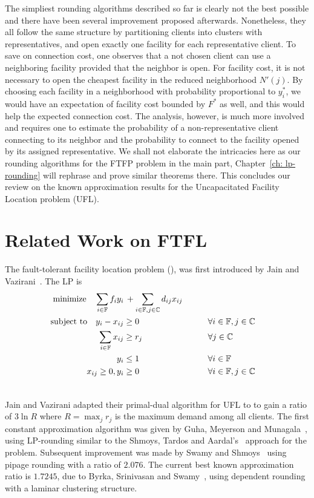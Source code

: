 \documentclass[oneside,final]{ucr}
\begin{document}
The simpliest rounding algorithms described so far is
clearly not the best possible and there have been several
improvement proposed afterwards. Nonetheless, they all
follow the same structure by partitioning clients into
clusters with representatives, and open exactly one facility
for each representative client. To save on connection cost,
one observes that a not chosen client can use a neighboring
facility provided that the neighbor is open. For facility
cost, it is not necessary to open the cheapest facility in
the reduced neighborhood $N'(j)$. By choosing each facility
in a neighborhood with probability proportional to
$y_i^\ast$, we would have an expectation of facility cost
bounded by $F^\ast$ as well, and this would help the
expected connection cost. The analysis, however, is much
more involved and requires one to estimate the probability
of a non-representative client connecting to its neighbor
and the probability to connect to the facility opened by its
assigned representative. We shall not elaborate the
intricacies here as our rounding algorithms for the FTFP
problem in the main part, Chapter~\ref{ch: lp-rounding} will
rephrase and prove similar theorems there. This concludes
our review on the known approximation results for the
Uncapacitated Facility Location problem (UFL).


\section{Related Work on FTFL}
The fault-tolerant facility location problem (\FTFL), was
first introduced by Jain and Vazirani~\cite{JainV03}.  The
LP is
\begin{alignat}{3}
  \textrm{minimize} \quad \sum_{i\in \mathbb{F}}f_iy_i &\,+
  \sum_{i\in \mathbb{F}, j\in \mathbb{C}} d_{ij}x_{ij}
  &\label{eqn:ftfl_primal}
\\ \notag
\textrm{subject to} \quad y_i - x_{ij} &\geq 0 &\quad\quad & \forall i\in \mathbb{F}, j\in \mathbb{C} 
\\ \notag
\sum_{i\in \mathbb{F}} x_{ij} &\geq r_j & &\forall j\in \mathbb{C}
\\ \notag
y_i &\leq 1 & &\forall i \in \mathbb{F}
\\ \notag
x_{ij} \geq 0, y_i &\geq 0 & &\forall i\in \mathbb{F}, j\in
\mathbb{C} 
\\ \notag
\end{alignat}

Jain and Vazirani adapted their primal-dual algorithm for
UFL to {\FTFL} to gain a ratio of $3\ln R$ where $R=\max_j
r_j$ is the maximum demand among all clients. The first
constant approximation algorithm was given by Guha, Meyerson
and Munagala~\cite{GuhaMM03}, using LP-rounding similar to
the Shmoys, Tardos and Aardal's~\cite{ShmoysTA97} approach
for the {\UFL} problem. Subsequent improvement was made by
Swamy and Shmoys~\cite{SwamyS08} using pipage rounding with
a ratio of $2.076$. The current best known approximation
ratio is $1.7245$, due to Byrka, Srinivasan and
Swamy~\cite{ByrkaSS10}, using dependent rounding with a
laminar clustering structure.
\end{document}
